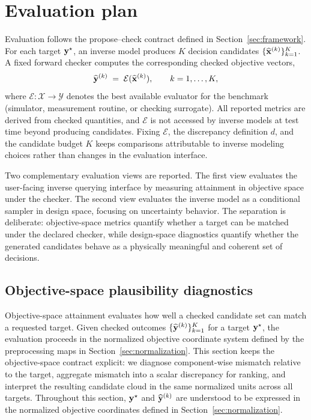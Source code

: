 \section{Evaluation plan}\label{sec:evaluation}

Evaluation follows the propose--check contract defined in Section~\ref{sec:framework}. For each target
$\mathbf{y}^{\star}$, an inverse model produces $K$ decision candidates
$\{\widehat{\mathbf{x}}^{(k)}\}_{k=1}^{K}$. A fixed forward checker computes the corresponding checked
objective vectors,
\[
  \widehat{\mathbf{y}}^{(k)} \;=\; \mathcal{E}(\widehat{\mathbf{x}}^{(k)}), \qquad k=1,\dots,K,
\]
where $\mathcal{E}:\mathcal{X}\rightarrow\mathcal{Y}$ denotes the best available evaluator for the
benchmark (simulator, measurement routine, or checking surrogate). All reported metrics are derived
from checked quantities, and $\mathcal{E}$ is not accessed by inverse models at test time beyond
producing candidates. Fixing $\mathcal{E}$, the discrepancy definition $d$, and the candidate budget
$K$ keeps comparisons attributable to inverse modeling choices rather than changes in the evaluation
interface.

Two complementary evaluation views are reported. The first view evaluates the user-facing inverse
querying interface by measuring attainment in objective space under the checker. The second view
evaluates the inverse model as a conditional sampler in design space, focusing on uncertainty
behavior. The separation is deliberate: objective-space metrics quantify whether a target can be
matched under the declared checker, while design-space diagnostics quantify whether the generated candidates behave as a physically meaningful and coherent set of decisions.


\subsection{Objective-space plausibility diagnostics}\label{sec:eval_objective}

Objective-space attainment evaluates how well a checked candidate set can match a requested target.
Given checked outcomes $\{\widehat{\mathbf{y}}^{(k)}\}_{k=1}^{K}$ for a target $\mathbf{y}^{\star}$, the
evaluation proceeds in the normalized objective coordinate system defined by the preprocessing maps in
Section~\ref{sec:normalization}. This section keeps the objective-space contract explicit: we diagnose
component-wise mismatch relative to the target, aggregate mismatch into a scalar discrepancy for
ranking, and interpret the resulting candidate cloud in the same normalized units across all targets.
Throughout this section, $\mathbf{y}^{\star}$ and $\widehat{\mathbf{y}}^{(k)}$ are understood to be
expressed in the normalized objective coordinates defined in Section~\ref{sec:normalization}.

